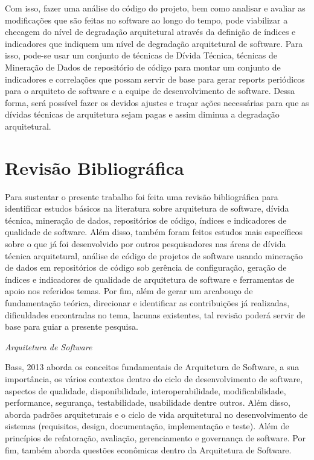 \documentclass[
	12pt,				%
	openright,			%
	twoside,			%
	a4paper,			%
	english,			%
	french,				%
	spanish,			%
	brazil,				%
	]{abntex2}
\begin{document}
Com isso, fazer uma análise do código do projeto, bem como analisar
e avaliar as modificações que são feitas no software ao longo do tempo,
pode viabilizar a checagem do nível de degradação arquitetural através
da definição de índices e indicadores que indiquem um nível de degradação
arquitetural de software. Para isso, pode-se usar um conjunto de técnicas
de Dívida Técnica, técnicas de Mineração de Dados de repositório de
código para montar um conjunto de indicadores e correlações que possam
servir de base para gerar reports periódicos para o arquiteto de software
e a equipe de desenvolvimento de software. Dessa forma, será possível
fazer os devidos ajustes e traçar ações necessárias para que as dívidas
técnicas de arquitetura sejam pagas e assim diminua a degradação arquitetural. 

\chapter{Revisão Bibliográfica}


Para sustentar o presente trabalho foi feita uma revisão bibliográfica
para identificar estudos básicos na literatura sobre arquitetura de
software, dívida técnica, mineração de dados, repositórios de código,
índices e indicadores de qualidade de software. Além disso, também
foram feitos estudos mais específicos sobre o que já foi desenvolvido
por outros pesquisadores nas áreas de dívida técnica arquitetural,
análise de código de projetos de software usando mineração de dados
em repositórios de código sob gerência de configuração, geração de
índices e indicadores de qualidade de arquitetura de software e ferramentas
de apoio nos referidos temas. Por fim, além de gerar um arcabouço
de fundamentação teórica, direcionar e identificar as contribuições
já realizadas, dificuldades encontradas no tema, lacunas existentes, tal
revisão poderá servir de base para guiar a presente pesquisa. 

\emph{Arquitetura de Software }

Bass, 2013 aborda os conceitos fundamentais de Arquitetura de Software,
a sua importância, os vários contextos dentro do ciclo de desenvolvimento
de software, aspectos de qualidade, disponibilidade, interoperabilidade,
modificabilidade, performance, segurança, testabilidade, usabilidade
dentre outros. Além disso, aborda padrões arquiteturais e o ciclo
de vida arquitetural no desenvolvimento de sistemas (requisitos, design,
documentação, implementação e teste). Além de princípios de refatoração,
avaliação, gerenciamento e governança de software. Por fim, também
aborda questões econômicas dentro da Arquitetura de Software. 
\end{document}
